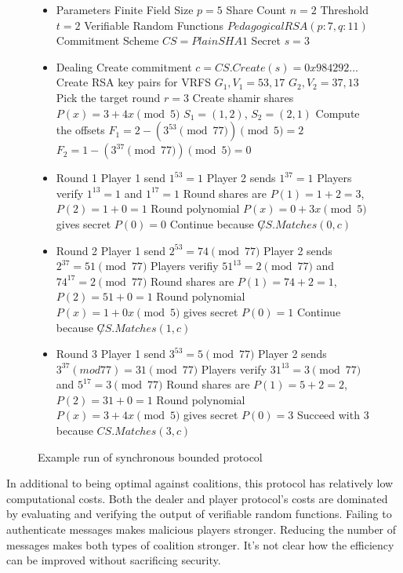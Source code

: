 \documentclass{dalcsthesis}
\begin{document}
\begin{figure}
  \caption{Example run of synchronous bounded protocol}
  \label{Ex:SB}
  \begin{itemize}
    \setlength{\itemsep}{0pt}
    \setlength{\parsep}{0pt}
    \setlength{\parskip}{0pt}
    \item Parameters
    \subitem Finite Field Size $p = 5$
    \subitem Share Count $n = 2$
    \subitem Threshold $t = 2$
    \subitem Verifiable Random Functions $PedagogicalRSA(p: 7, q: 11)$
    \subitem Commitment Scheme $CS = PlainSHA1$
    \subitem Secret $s = 3$
    \item Dealing
    \subitem Create commitment $c = CS.Create(s) = 0x984292\ldots$
    \subitem Create RSA key pairs for VRFS
    \subsubitem $G_1, V_1 = 53, 17$
    \subsubitem $G_2, V_2 = 37, 13$
    \subitem Pick the target round $r = 3$
    \subitem Create shamir shares
    \subsubitem $P(x) = 3 + 4x \pmod{5}$
    \subsubitem $S_1 = (1, 2)$, $S_2 = (2, 1)$
    \subitem Compute the offsets 
    \subsubitem $F_1 = 2 - (3^{53} \pmod{77}) \pmod{5} = 2$
    \subsubitem $F_2 = 1 - (3^{37} \pmod{77}) \pmod{5} = 0$
	\item Round 1
	\subitem Player 1 send $1^{53} = 1$
	\subitem Player 2 sends $1^{37} = 1$
	\subitem Players verify $1^{13} = 1$ and $1^{17} = 1$
	\subitem Round shares are $P(1) = 1+2 = 3$, $P(2) = 1+0 = 1$
	\subitem Round polynomial $P(x) = 0 + 3x \pmod{5}$ gives secret $P(0) = 0$
	\subitem Continue because $\not CS.Matches(0, c)$
	\item Round 2
	\subitem Player 1 send $2^{53} = 74 \pmod{77}$
	\subitem Player 2 sends $2^{37} = 51 \pmod{77}$
	\subitem Players verifiy $51^{13} = 2 \pmod{77}$ and $74^{17} = 2 \pmod{77}$
	\subitem Round shares are $P(1) = 74+2 = 1$, $P(2) = 51+0 = 1$
	\subitem Round polynomial $P(x) = 1 + 0x \pmod{5}$ gives secret $P(0) = 1$
	\subitem Continue because $\not CS.Matches(1, c)$
	\item Round 3
	\subitem Player 1 send $3^{53} = 5 \pmod{77}$
	\subitem Player 2 sends $3^{37} (mod 77) = 31 \pmod{77}$
	\subitem Players verify $31^{13} = 3 \pmod{77}$ and $5^{17} = 3 \pmod{77}$
	\subitem Round shares are $P(1) = 5+2 = 2$, $P(2) = 31+0 = 1$ 
	\subitem Round polynomial $P(x) = 3+4x \pmod{5}$ gives secret $P(0) = 3$
	\subitem Succeed with 3 because $CS.Matches(3, c)$
  \end{itemize}
\end{figure}

In additional to being optimal against coalitions, this protocol has relatively low computational costs. Both the dealer and player protocol's costs are dominated by evaluating and verifying the output of verifiable random functions. Failing to authenticate messages makes malicious players stronger. Reducing the number of messages makes both types of coalition stronger. It's not clear how the efficiency can be improved without sacrificing security.
\end{document}
